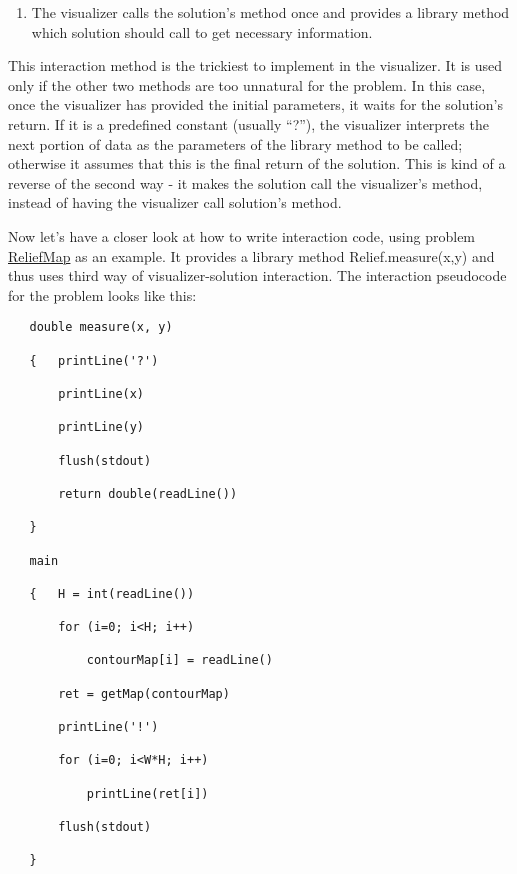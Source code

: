 \documentclass[]{article}
\providecommand{\tightlist}{%
  \setlength{\itemsep}{0pt}\setlength{\parskip}{0pt}}
\begin{document}
\begin{enumerate}
\def\labelenumi{\arabic{enumi}.}
\setcounter{enumi}{2}
\tightlist
\item
  The visualizer calls the solution's method once and provides a library
  method which solution should call to get necessary information.
\end{enumerate}

This interaction method is the trickiest to implement in the visualizer.
It is used only if the other two methods are too unnatural for the
problem. In this case, once the visualizer has provided the initial
parameters, it waits for the solution's return. If it is a predefined
constant (usually ``?''), the visualizer interprets the next portion of
data as the parameters of the library method to be called; otherwise it
assumes that this is the final return of the solution. This is kind of a
reverse of the second way - it makes the solution call the visualizer's
method, instead of having the visualizer call solution's method.

Now let's have a closer look at how to write interaction code, using
problem
\href{http://www.topcoder.com/longcontest/?module=ViewProblemStatement\&rd=13766\&pm=10322}{ReliefMap}
as an example. It provides a library method Relief.measure(x,y) and thus
uses third way of visualizer-solution interaction. The interaction
pseudocode for the problem looks like this:

\begin{verbatim}
   double measure(x, y)

   {   printLine('?')

       printLine(x)

       printLine(y)

       flush(stdout)

       return double(readLine())

   }

   main

   {   H = int(readLine())

       for (i=0; i<H; i++)

           contourMap[i] = readLine()

       ret = getMap(contourMap)

       printLine('!')

       for (i=0; i<W*H; i++)

           printLine(ret[i])

       flush(stdout)

   }
\end{verbatim}
\end{document}
